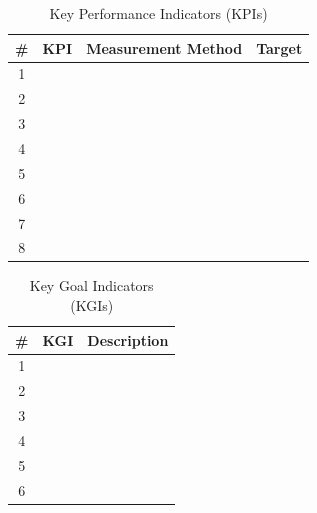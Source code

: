 
\begin{table}[H]

\centering

\caption{Key Performance Indicators (KPIs)}

\label{tab:kpis}

\begin{tabularx}{\textwidth}{
c
X
X
c
}

\toprule

\# &
KPI &
Measurement Method &
Target \\

\midrule

1 & & & \\
2 & & & \\
3 & & & \\
4 & & & \\
5 & & & \\
6 & & & \\
7 & & & \\
8 & & & \\

\bottomrule

\end{tabularx}

\end{table}


\begin{table}[H]

\centering

\caption{Key Goal Indicators (KGIs)}

\label{tab:kgis}

\begin{tabularx}{\textwidth}{
c
X
X
}

\toprule

\# &
KGI &
Description \\

\midrule

1 & & \\
2 & & \\
3 & & \\
4 & & \\
5 & & \\
6 & & \\

\bottomrule

\end{tabularx}

\end{table}
